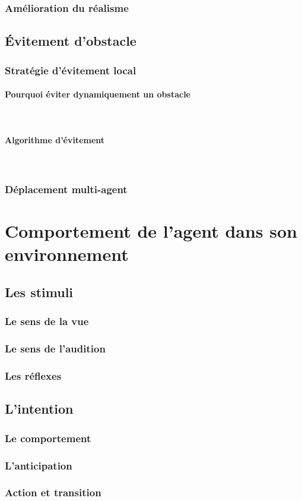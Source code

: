 \documentclass[hidelinks,a4paper, 12pt]{article}
\newcommand{\subsubsubsection}[1]{\paragraph{#1}\mbox{}\\}
\begin{document}
    \subsubsection{Amélioration du réalisme}
    \subsection{Évitement d'obstacle}
    \subsubsection{Stratégie d'évitement local}
    \subsubsubsection{Pourquoi éviter dynamiquement un obstacle}
    \subsubsubsection{Algorithme d'évitement}
    \subsubsection{Déplacement multi-agent}

    \section{Comportement de l'agent dans son environnement}
    \subsection{Les stimuli}
    \subsubsection{Le sens de la vue}
    \subsubsection{Le sens de l'audition}
    \subsubsection{Les réflexes}
    \subsection{L'intention}
    \subsubsection{Le comportement}
    \subsubsection{L'anticipation}
    \subsubsection{Action et transition}
\end{document}
